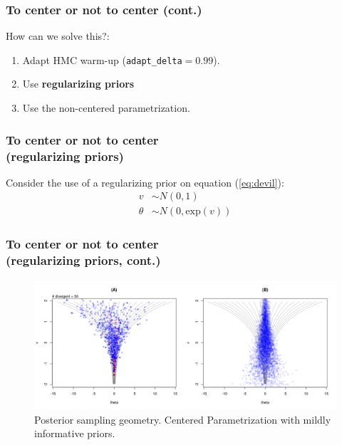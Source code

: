 \documentclass[arial,12pt,xcolor=dvipsnames]{beamer}
\begin{document}
%
\begin{frame}
	\frametitle{To center or not to center (cont.)}
	How can we solve this?:
	\begin{enumerate}
		\item Adapt HMC warm-up (\texttt{adapt\_delta}$=0.99$).
		\item Use \textbf{regularizing priors}
		\item Use the non-centered parametrization.
	\end{enumerate}
\end{frame}
%
\begin{frame}
	\frametitle{To center or not to center \\
		(regularizing priors)}
	Consider the use of a regularizing prior on equation (\ref{eq:devil}): 
	\begin{equation} \label{eq:devil_prior}
		\begin{split}	
			v &\sim N(0, 1) \\
			\theta &\sim N(0, \text{exp}(v))
		\end{split}
	\end{equation}
\end{frame}
%
\begin{frame}
	\frametitle{To center or not to center \\
		(regularizing priors, cont.)}
	\begin{figure}[!h]
		\centering
		\includegraphics[width=1\linewidth]{2_funnel_CE_priors}
		\caption{Posterior sampling geometry. Centered Parametrization with mildly informative priors.}
		\label{fig:devil_prior_geom}
	\end{figure}
\end{frame}
%
\end{document}
